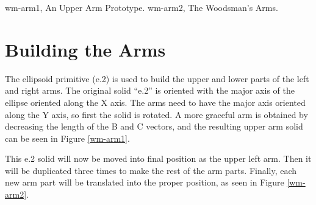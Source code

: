 
\mfig wm-arm1, An Upper Arm Prototype.
\mfig wm-arm2, The Woodsman's Arms.
\section{Building the Arms}

The ellipsoid primitive (e.2) is used to build the upper and lower parts 
of the left and right arms.
The original solid ``e.2'' is oriented with the major axis of the ellipse
oriented along the X axis.
The arms need to have the major axis oriented along the Y axis,
so first the solid is rotated.
A more graceful arm is obtained by decreasing the length of
the B and C vectors, and the resulting upper arm solid can be
seen in Figure \ref{wm-arm1}.


This e.2 solid will now be moved into final position as the upper left arm.
Then it will be duplicated three times
to make the rest of the arm parts.  Finally, each new arm
part will be translated into the proper position,
as seen in Figure \ref{wm-arm2}.


